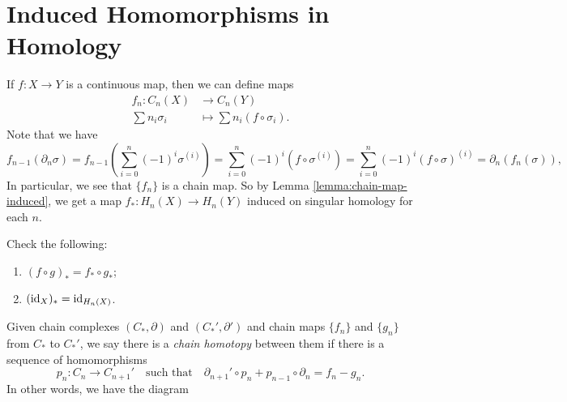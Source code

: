 \section{Induced Homomorphisms in Homology}
\begin{remark}
  If $f : X \to Y$ is a continuous map, then we can
  define maps
  \begin{align*}
    f_n : C_n(X) &\longrightarrow C_n(Y) \\
    \sum n_i \sigma_i &\longmapsto \sum n_i (f \circ \sigma_i).
  \end{align*}
  Note that we have
  \[
    f_{n - 1}(\partial_n \sigma)
    = f_{n - 1} \left(\sum_{i = 0}^n (-1)^i \sigma^{(i)}\right)
    = \sum_{i = 0}^n (-1)^i (f \circ \sigma^{(i)})
    = \sum_{i = 0}^n (-1)^i (f \circ \sigma)^{(i)}
    = \partial_n(f_n(\sigma)),
  \]
  In particular, we see that $\{f_n\}$ is a chain map.
  So by Lemma \ref{lemma:chain-map-induced}, we get
  a map $f_* : H_n(X) \to H_n(Y)$
  induced on singular homology for each $n$.
\end{remark}

\begin{exercise}
  Check the following:
  \begin{enumerate}
    \item $(f \circ g)_* = f_* \circ g_*$;
    \item $(\operatorname{id}_X)_* = \operatorname{id}_{H_n(X)}$.
  \end{enumerate}
\end{exercise}

\begin{definition}
  Given chain complexes
  $(C_*, \partial)$ and $(C_*', \partial')$
  and chain maps $\{f_n\}$ and $\{g_n\}$
  from $C_*$ to $C_*'$, we say there is a
  \emph{chain homotopy} between them if there is a
  sequence of homomorphisms
  \[
    p_n : C_n \to C_{n + 1}' \quad \text{such that} \quad
    \partial_{n + 1}' \circ p_n + p_{n - 1} \circ \partial_n = f_n - g_n.
  \]
  In other words, we have the diagram
  \begin{center}
  \end{center}
\end{definition}


